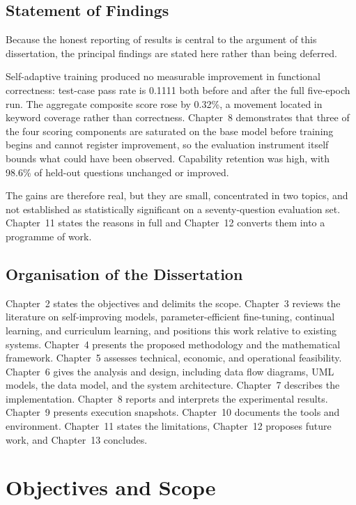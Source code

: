 \documentclass[12pt,a4paper]{report}
\begin{document}
\section{Statement of Findings}

Because the honest reporting of results is central to the argument of this dissertation, the principal findings are stated here rather than being deferred.

Self-adaptive training produced no measurable improvement in functional correctness: test-case pass rate is 0.1111 both before and after the full five-epoch run. The aggregate composite score rose by 0.32\%, a movement located in keyword coverage rather than correctness. Chapter~8 demonstrates that three of the four scoring components are saturated on the base model before training begins and cannot register improvement, so the evaluation instrument itself bounds what could have been observed. Capability retention was high, with 98.6\% of held-out questions unchanged or improved.

The gains are therefore real, but they are small, concentrated in two topics, and not established as statistically significant on a seventy-question evaluation set. Chapter~11 states the reasons in full and Chapter~12 converts them into a programme of work.

\section{Organisation of the Dissertation}

Chapter~2 states the objectives and delimits the scope. Chapter~3 reviews the literature on self-improving models, parameter-efficient fine-tuning, continual learning, and curriculum learning, and positions this work relative to existing systems. Chapter~4 presents the proposed methodology and the mathematical framework. Chapter~5 assesses technical, economic, and operational feasibility. Chapter~6 gives the analysis and design, including data flow diagrams, UML models, the data model, and the system architecture. Chapter~7 describes the implementation. Chapter~8 reports and interprets the experimental results. Chapter~9 presents execution snapshots. Chapter~10 documents the tools and environment. Chapter~11 states the limitations, Chapter~12 proposes future work, and Chapter~13 concludes.

\chapter{Objectives and Scope}
\end{document}
